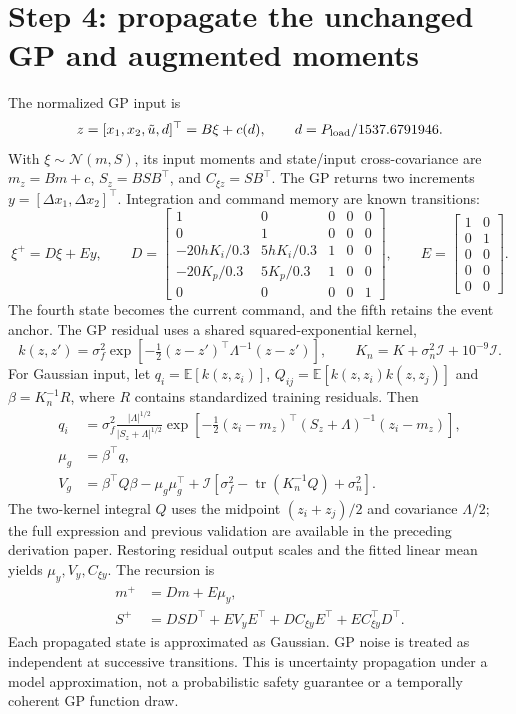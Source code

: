 \documentclass[11pt,a4paper]{article}
\newcommand{\E}{\mathbb E}\newcommand{\Cov}{\operatorname{Cov}}\newcommand{\Var}{\operatorname{Var}}
\begin{document}
\section{Step 4: propagate the unchanged GP and augmented moments}
The normalized GP input is
\begin{equation}
z=[x_1,x_2,\tilde u,d]^\top=B\xi+c(d),\qquad d=P_{\rm load}/1537.6791946.
\end{equation}
With $\xi\sim\mathcal N(m,S)$, its input moments and state/input cross-covariance are $m_z=Bm+c$, $S_z=BSB^\top$, and $C_{\xi z}=SB^\top$. The GP returns two increments $y=[\Delta x_1,\Delta x_2]^\top$. Integration and command memory are known transitions:
\begin{equation}
\xi^+=D\xi+Ey,\qquad
D=\begin{bmatrix}
1&0&0&0&0\\0&1&0&0&0\\-20hK_i/0.3&5hK_i/0.3&1&0&0\\
-20K_p/0.3&5K_p/0.3&1&0&0\\0&0&0&0&1
\end{bmatrix},\qquad E=\begin{bmatrix}1&0\\0&1\\0&0\\0&0\\0&0\end{bmatrix}.
\end{equation}
The fourth state becomes the current command, and the fifth retains the event anchor. The GP residual uses a shared squared-exponential kernel,
\begin{equation}
k(z,z')=\sigma_f^2\exp[-\tfrac12(z-z')^\top\Lambda^{-1}(z-z')],\qquad K_n=K+\sigma_n^2\mathcal I+10^{-9}\mathcal I.
\end{equation}
For Gaussian input, let $q_i=\E[k(z,z_i)]$, $Q_{ij}=\E[k(z,z_i)k(z,z_j)]$ and $\beta=K_n^{-1}R$, where $R$ contains standardized training residuals. Then
\begin{align}
q_i&=\sigma_f^2\frac{|\Lambda|^{1/2}}{|S_z+\Lambda|^{1/2}}
\exp[-\tfrac12(z_i-m_z)^\top(S_z+\Lambda)^{-1}(z_i-m_z)],\\
\mu_g&=\beta^\top q,\\
V_g&=\beta^\top Q\beta-\mu_g\mu_g^\top+
\mathcal I[\sigma_f^2-\operatorname{tr}(K_n^{-1}Q)+\sigma_n^2].
\end{align}
The two-kernel integral $Q$ uses the midpoint $(z_i+z_j)/2$ and covariance $\Lambda/2$; the full expression and previous validation are available in the preceding derivation paper. Restoring residual output scales and the fitted linear mean yields $\mu_y,V_y,C_{\xi y}$. The recursion is
\begin{align}
m^+&=Dm+E\mu_y,\\
S^+&=DSD^\top+EV_yE^\top+DC_{\xi y}E^\top+EC_{\xi y}^\top D^\top.
\end{align}
Each propagated state is approximated as Gaussian. GP noise is treated as independent at successive transitions. This is uncertainty propagation under a model approximation, not a probabilistic safety guarantee or a temporally coherent GP function draw.
\end{document}

